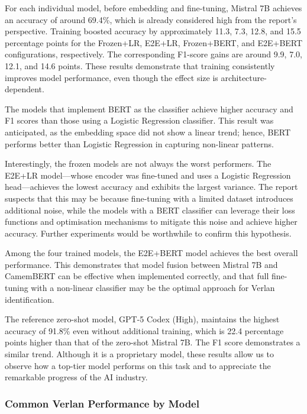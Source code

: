 \documentclass[12pt]{article}
\begin{document}
For each individual model, before embedding and fine-tuning, Mistral 7B achieves an accuracy of around 69.4\%, which is already considered high from the report's perspective. 
Training boosted accuracy by approximately 11.3, 7.3, 12.8, and 15.5 percentage points for the Frozen+LR, E2E+LR, Frozen+BERT, and E2E+BERT configurations, respectively.
The corresponding F1-score gains are around 9.9, 7.0, 12.1, and 14.6 points.
These results demonstrate that training consistently improves model performance, even though the effect size is architecture-dependent.

The models that implement BERT as the classifier achieve higher accuracy and F1 scores than those using a Logistic Regression classifier. 
This result was anticipated, as the embedding space did not show a linear trend; hence, BERT performs better than Logistic Regression in capturing non-linear patterns.

Interestingly, the frozen models are not always the worst performers. 
The E2E+LR model\;---\;whose encoder was fine-tuned and uses a Logistic Regression head\;---\;achieves the lowest accuracy and exhibits the largest variance. 
The report suspects that this may be because fine-tuning with a limited dataset introduces additional noise, while the models with a BERT classifier can leverage their loss functions and optimisation mechanisms to mitigate this noise and achieve higher accuracy. 
Further experiments would be worthwhile to confirm this hypothesis.

Among the four trained models, the E2E+BERT model achieves the best overall performance. 
This demonstrates that model fusion between Mistral 7B and CamemBERT can be effective when implemented correctly, and that full fine-tuning with a non-linear classifier may be the optimal approach for Verlan identification.

The reference zero-shot model, GPT-5 Codex (High), maintains the highest accuracy of 91.8\% even without additional training, which is 22.4 percentage points higher than that of the zero-shot Mistral 7B. 
The F1 score demonstrates a similar trend. 
Although it is a proprietary model, these results allow us to observe how a top-tier model performs on this task and to appreciate the remarkable progress of the AI industry.

\subsubsection{Common Verlan Performance by Model}
\end{document}
